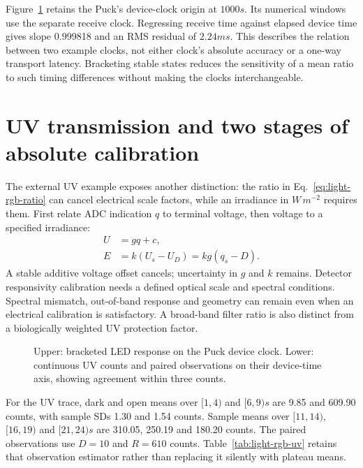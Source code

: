 Figure~\ref{fig:light-rgb-reference-transfer} retains the Puck's device-clock origin at $1000\unit{s}$. Its numerical windows use the separate receive clock. Regressing receive time against elapsed device time gives slope 0.999818 and an RMS residual of $2.24\unit{ms}$. This describes the relation between two example clocks, not either clock's absolute accuracy or a one-way transport latency. Bracketing stable states reduces the sensitivity of a mean ratio to such timing differences without making the clocks interchangeable.

\section{UV transmission and two stages of absolute calibration}
The external UV example exposes another distinction: the ratio in Eq.~\eqref{eq:light-rgb-ratio} can cancel electrical scale factors, while an irradiance in $\unit{W\,m^{-2}}$ requires them. First relate ADC indication $q$ to terminal voltage, then voltage to a specified irradiance:
\begin{align}
 U&=gq+c,\label{eq:light-rgb-adc}\\
 E&=k(U_s-U_D)=kg(q_s-D).
 \label{eq:light-rgb-radiometry}
\end{align}
A stable additive voltage offset cancels; uncertainty in $g$ and $k$ remains. Detector responsivity calibration needs a defined optical scale and spectral conditions\cite{larason2008}. Spectral mismatch, out-of-band response and geometry can remain even when an electrical calibration is satisfactory\cite{larason2001}. A broad-band filter ratio is also distinct from a biologically weighted UV protection factor\cite{cie220}.

\begin{figure}[!htbp]
\centering
\caption{Upper: bracketed LED response on the Puck device clock. Lower: continuous UV counts and paired observations on their device-time axis, showing agreement within three counts.}
\label{fig:light-rgb-reference-transfer}
\end{figure}

For the UV trace, dark and open means over $[1,4)$ and $[6,9)\unit{s}$ are 9.85 and 609.90 counts, with sample SDs 1.30 and 1.54 counts. Sample means over $[11,14)$, $[16,19)$ and $[21,24)\unit{s}$ are 310.05, 250.19 and 180.20 counts. The paired observations use $D=10$ and $R=610$ counts. Table~\ref{tab:light-rgb-uv} retains that observation estimator rather than replacing it silently with plateau means.

